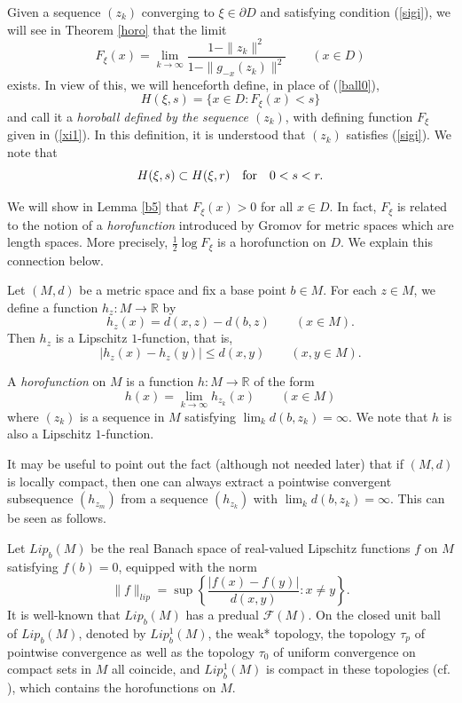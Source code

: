 \documentclass[12pt, twoside]{article}
\theoremstyle{definition}
\numberwithin{equation}{section}
\begin{document}
Given a sequence $(z_k)$ converging to $\xi \in \partial D$ and satisfying condition (\ref{sigi}),
 we will see in Theorem \ref{horo} that  the limit
\begin{equation}\label{xi1}
 F_\xi (x) =\lim_{k\rightarrow \infty} \frac{1-\|z_k\|^2}{1-\|g_{-x}(z_k)\|^2} \qquad (x\in D)
 \end{equation}
 exists. In view of this,
 we will henceforth define, in place of (\ref{ball0}),
\begin{equation}\label{ball}
H(\xi,s) = \{ x\in D: F_\xi (x) <s\}
\end{equation}
and call it a {\it horoball defined by the sequence $(z_k)$},
with  defining function $F_\xi$ given in (\ref{xi1}). In this definition, it is understood
that $(z_k)$ satisfies (\ref{sigi}).
We note that
$$H(\xi, s) \subset H(\xi,r) \quad {\rm for}\quad 0<s<r.$$

We will show in Lemma \ref{b5} that $F_\xi(x) >0$ for all $x\in D$.
In fact,
$F_\xi$ is related to the notion of a {\it horofunction} introduced by Gromov \cite{ball,grom} for metric spaces
which are length spaces.
More precisely, $\frac{1}{2} \log F_\xi$ is a horofunction on $D$.
We explain  this connection below.

Let $(M,d)$ be a metric space and fix a base point $b\in M$. For each $z\in M$,
 we define a function $h_z: M \longrightarrow \mathbb{R}$ by
$$h_z(x) = d(x,z) - d(b,z) \qquad (x\in M).$$
Then $h_z$ is a Lipschitz $1$-function, that is,
$$|h_z(x) - h_z(y)| \leq d(x,y) \qquad (x,y\in M).$$

A {\it horofunction} on $M$ is a function $h: M \longrightarrow \mathbb{R}$ of the form
\begin{equation}\label{gro}
h(x) = \lim_{k\rightarrow \infty} h_{z_k}(x) \qquad (x\in M)
\end{equation}
where $(z_k)$ is a sequence in $M$ satisfying $\lim_k d(b, z_k) =\infty$.
We note that $h$ is also a Lipschitz $1$-function.

It may be useful to point out  the fact (although not needed later)
that if $(M,d)$ is locally compact, then one can always extract a pointwise convergent subsequence
$(h_{z_m})$ from a sequence $(h_{z_k})$ with $\lim_k d(b, z_k) =\infty$.
 This can be seen as follows.

Let $Lip_b(M)$ be the real Banach space of real-valued Lipschitz functions $f$ on $M$ satisfying $f(b)=0$, equipped with the norm
 $$\|f\|_{lip} = \sup \left\{ \frac{|f(x)-f(y)|}{d(x,y)} : x\neq y\right\}.$$
 It is well-known that $Lip_b(M)$ has a predual $\mathcal{F}(M)$. %
On the closed unit ball of $Lip_b(M)$, denoted by $Lip_b^1(M)$, the weak* topology,
 the topology $\tau_p$ of pointwise convergence as well as the topology $\tau_0$ of uniform convergence on compact sets
 in $M$ all coincide,
 and $Lip_b^1(M)$ is compact in these topologies (cf. \cite[p. 642]{jv}), which contains the horofunctions on $M$.
\end{document}
